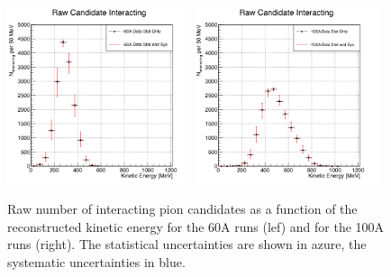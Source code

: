 \begin{figure}[p]
\centering  
\includegraphics[width=0.48\textwidth]{Chapter-6/Images/Plots60A_StatSyst.png}
\includegraphics[width=0.48\textwidth]{Chapter-6/Images/Plots100A_StatSyst.png}
\caption{Raw number of interacting pion candidates as a function of the reconstructed kinetic energy for the 60A runs (lef) and for the 100A runs (right). The statistical uncertainties are shown in azure, the systematic uncertainties in blue.}
\label{fig:InteractingRaw}
\end{figure}


